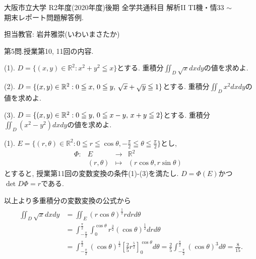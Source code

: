 \documentclass[dvipdfmx,a4paper,11pt]{article}
\newcommand{\R}{\mathbb{R}}
\theoremstyle{definition}
\begin{document}
\newpage
\begin{center}
{ \large 大阪市立大学 R2年度(2020年度)後期  全学共通科目 解析II TI機・情33 $\sim$} \\

{\LARGE 期末レポート問題解答例.} 
\end{center}
\begin{flushright}
 担当教官: 岩井雅崇(いわいまさたか) 
\end{flushright}


{\Large 第5問.}授業第10, 11回の内容.
\vspace{11pt}

{\large(1). $D=\{ (x,y) \in \R^2 : x^2 + y^2 \leqq x\}$とする.
重積分$\iint_{D} \sqrt{x}dxdy$の値を求めよ.}

\vspace{11pt}
{\large(2). $D=\{ (x,y) \in \R^2 : 0 \leqq x, \text{\,}  0 \leqq y,\text{\,} \sqrt{x} + \sqrt{y} \leqq 1\}$とする.
重積分$\iint_{D} x^2dxdy$の値を求めよ.}

\vspace{11pt}
{\large(3). $D=\{ (x,y) \in \R^2 : 0 \leqq y, \text{\,} 0 \leqq x-y, \text{\,} x+y \leqq 2\}$とする.
重積分$\iint_{D} (x^2-y^2)dxdy$の値を求めよ.}

 
 \vspace{11pt}
 
\hspace{-11pt}{\Large $\bullet$ 第5問解答例}

 (1). 
 $E= \{ (r ,\theta) \in \R^2 : 0 \leqq r \leqq \cos \theta, 
 -\frac{\pi}{2}\leqq \theta  \leqq\frac{\pi}{2}\}$とし, 
 $$
\begin{array}{ccccc}
\Phi: &E & \rightarrow & \R^2 & \\
&(r,\theta) & \longmapsto & (r \cos \theta , r \sin \theta)&
\end{array}
$$
とすると, 授業第11回の変数変換の条件(1)-(3)を満たし. $D = \Phi(E)$かつ$\det D\Phi =r$である.

以上より多重積分の変数変換の公式から
\begin{align*}
\begin{split}
\iint_{D} \sqrt{x}dxdy
&=
\iint_{E}  (r\cos \theta)^{\frac{1}{2}} rdrd\theta \\
&= \int_{- \frac{\pi}{2}}^{\frac{\pi}{2}} 
 \int_{0}^{\cos \theta} r^{\frac{3}{2}} (\cos \theta)^{\frac{1}{2}} drd\theta \\
&=
\int_{- \frac{\pi}{2}}^{\frac{\pi}{2}} (\cos \theta)^{\frac{1}{2}} 
 \left[ \frac{2}{5}r^{\frac{5}{2}} \right]_{0}^{\cos \theta} d\theta 
=\frac{2}{5} \int_{- \frac{\pi}{2}}^{\frac{\pi}{2}} (\cos \theta)^{3} d\theta 
=\frac{8}{15}.
    \end{split}
  \end{align*}
 
\end{document}
